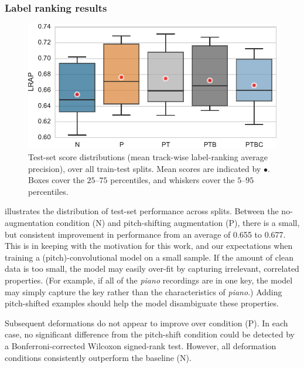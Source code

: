 \documentclass{article}
\begin{document}
\subsubsection{Label ranking results}
\begin{figure}
    \centering
    \includegraphics[width=0.9\columnwidth]{figs/lrapall}
    \vspace{-\baselineskip}
    \caption{Test-set score distributions (mean track-wise label-ranking average
        precision), over all train-test splits. Mean scores are indicated by \color{red}
        $\bullet$\normalcolor{}.
        Boxes cover the $25$--$75$ percentiles, and whiskers cover the $5$--$95$
        percentiles.\label{lrapresults}}
\end{figure}

 illustrates the distribution of test-set performance across splits. 
Between the no-augmentation condition (N) and pitch-shifting augmentation (P), 
there is a small, but consistent improvement in performance from an average of 0.655 to
0.677.  This is in keeping with the motivation for this work, and our 
expectations when training a (pitch)-convolutional model on a small sample.
If the amount of clean data is too small, the model may easily over-fit by capturing
irrelevant, correlated properties.
(For example, if all of the \emph{piano} recordings are in one key, the model may simply
capture the key rather than the characteristics of \emph{piano}.)
Adding pitch-shifted examples should help the model disambiguate these properties.

Subsequent deformations do not appear to improve over condition (P).
In each case, no significant difference from the pitch-shift condition could be detected 
by a Bonferroni-corrected Wilcoxon signed-rank test.
However, all deformation conditions consistently outperform the baseline (N).
\end{document}
